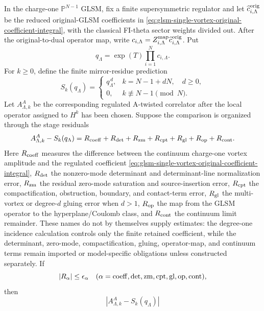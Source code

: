\begin{remark}
\label{rem:glsm-vortex-to-observable-proof-obligation-map}
In the charge-one \(\mathbb P^{N-1}\) GLSM, fix a finite supersymmetric
regulator and let \(\widehat c^{\rm orig}_{i,\Lambda}\) be the reduced
original-GLSM coefficients in
\eqref{eq:glsm-single-vortex-original-coefficient-integral}, with the
classical FI-theta sector weights divided out.  After the original-to-dual
operator map, write
\(c_{i,\Lambda}=Z^{\rm map}_{i,\Lambda}\widehat c^{\rm orig}_{i,\Lambda}\).
Put
\[
  q_\Lambda
  =
  \exp(T)\prod_{i=1}^N c_{i,\Lambda}.
\]
For \(k\ge0\), define the finite mirror-residue prediction
\[
  S_k(q_\Lambda)
  =
  \begin{cases}
    q_\Lambda^{\,d}, & k=N-1+dN,\quad d\ge0,\\
    0, & k\not\equiv N-1\pmod N .
  \end{cases}
\]
Let \(A_{\Lambda,k}^{A}\) be the corresponding regulated A-twisted
correlator after the local operator assigned to \(H^k\) has been chosen.
Suppose the comparison is organized through the stage residuals
\begin{equation}
  A_{\Lambda,k}^{A}-S_k(q_\Lambda)
  =
  R_{\rm coeff}
  +R_{\rm det}
  +R_{\rm zm}
  +R_{\rm cpt}
  +R_{\rm gl}
  +R_{\rm op}
  +R_{\rm cont}.
  \label{eq:glsm-vortex-to-observable-residual-telescope}
\end{equation}
Here \(R_{\rm coeff}\) measures the difference between the continuum
charge-one vortex amplitude and the regulated coefficient
\eqref{eq:glsm-single-vortex-original-coefficient-integral},
\(R_{\rm det}\) the nonzero-mode determinant and determinant-line
normalization error, \(R_{\rm zm}\) the residual zero-mode saturation and
source-insertion error, \(R_{\rm cpt}\) the compactification, obstruction,
boundary, and contact-term error, \(R_{\rm gl}\) the multi-vortex or
degree-\(d\) gluing error when \(d>1\), \(R_{\rm op}\) the map from the GLSM
operator to the hyperplane/Coulomb class, and \(R_{\rm cont}\) the continuum
limit remainder.  These names do not by themselves supply estimates: the
degree-one incidence calculation controls only the finite retained
coefficient, while the determinant, zero-mode, compactification, gluing,
operator-map, and continuum terms remain imported or model-specific
obligations unless constructed separately.  If
\[
  |R_\alpha|\le \epsilon_\alpha
  \quad
  (\alpha={\rm coeff,det,zm,cpt,gl,op,cont}),
\]
then
\begin{equation}
  \left|A_{\Lambda,k}^{A}-S_k(q_\Lambda)\right|

\end{equation}
\end{remark}
